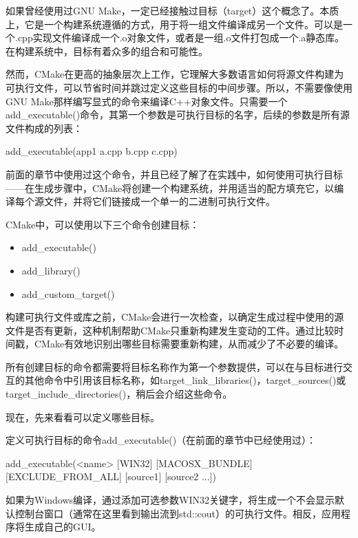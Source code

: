 如果曾经使用过GNU Make，一定已经接触过目标（target）这个概念了。本质上，它是一个构建系统遵循的方式，用于将一组文件编译成另一个文件。可以是一个.cpp实现文件编译成一个.o对象文件，或者是一组.o文件打包成一个.a静态库。在构建系统中，目标有着众多的组合和可能性。

然而，CMake在更高的抽象层次上工作，它理解大多数语言如何将源文件构建为可执行文件，可以节省时间并跳过定义这些目标的中间步骤。所以，不需要像使用GNU Make那样编写显式的命令来编译C++对象文件。只需要一个add\_executable()命令，其第一个参数是可执行目标的名字，后续的参数是所有源文件构成的列表：

\begin{cmake}
add_executable(app1 a.cpp b.cpp c.cpp)
\end{cmake}

前面的章节中使用过这个命令，并且已经了解了在实践中，如何使用可执行目标——在生成步骤中，CMake将创建一个构建系统，并用适当的配方填充它，以编译每个源文件，并将它们链接成一个单一的二进制可执行文件。

CMake中，可以使用以下三个命令创建目标：

\begin{itemize}
\item
add\_executable()

\item
add\_library()

\item
add\_custom\_target()
\end{itemize}

构建可执行文件或库之前，CMake会进行一次检查，以确定生成过程中使用的源文件是否有更新，这种机制帮助CMake只重新构建发生变动的工件。通过比较时间戳，CMake有效地识别出哪些目标需要重新构建，从而减少了不必要的编译。

所有创建目标的命令都需要将目标名称作为第一个参数提供，可以在与目标进行交互的其他命令中引用该目标名称，如target\_link\_libraries()，target\_sources()或target\_include\_directories()，稍后会介绍这些命令。

现在，先来看看可以定义哪些目标。


定义可执行目标的命令add\_executable()（在前面的章节中已经使用过）：

\begin{shell}
add_executable(<name> [WIN32] [MACOSX_BUNDLE]
                [EXCLUDE_FROM_ALL]
                [source1] [source2 ...])
\end{shell}

如果为Windows编译，通过添加可选参数WIN32关键字，将生成一个不会显示默认控制台窗口（通常在这里看到输出流到std::cout）的可执行文件。相反，应用程序将生成自己的GUI。

